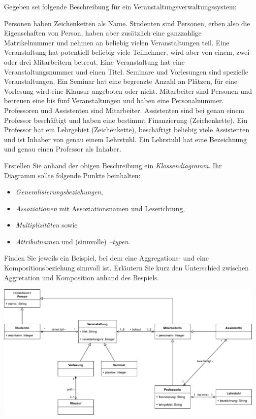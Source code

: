 \documentclass{abgabe}
\begin{document}
\begin{questions}

    Gegeben sei folgende Beschreibung für ein Veranstaltungsverwaltungssystem:

    Personen haben Zeichenketten als Name.
    Studenten sind Personen, erben also die Eigenschaften von Person, haben aber zusätzlich eine ganzzahlige Matrikelnummer und nehmen an beliebig vielen Veranstaltungen teil.
    Eine Veranstaltung hat potentiell beliebig viele Teilnehmer, wird aber von einem, zwei oder drei Mitarbeitern betreut.
    Eine Veranstaltung hat eine Veranstaltungsnummer und einen Titel.
    Seminare und Vorlesungen sind spezielle Veranstaltungen.
    Ein Seminar hat eine begrenzte Anzahl an Plätzen, für eine Vorlesung wird eine Klausur angeboten oder nicht.
    Mitarbeiter sind Personen und betreuen eine bis fünf Veranstaltungen und haben eine Personalnummer.
    Professoren und Assistenten sind Mitarbeiter.
    Assistenten sind bei genau einem Professor beschäftigt und haben eine bestimmt Finanzierung (Zeichenkette).
    Ein Professor hat ein Lehrgebiet (Zeichenkette), beschäftigt beliebig viele Assistenten und ist Inhaber von genau einem Lehrstuhl.
    Ein Lehrstuhl hat eine Bezeichnung und genau einen Professor als Inhaber.

    Erstellen Sie anhand der obigen Beschreibung ein \emph{Klassendiagramm}.
    Ihr Diagramm sollte folgende Punkte beinhalten:
    \begin{itemize}
        \item \emph{Generalisierungsbeziehungen},
        \item \emph{Assoziationen} mit Assoziationsnamen und Leserichtung,
        \item \emph{Multiplizitäten} sowie
        \item \emph{Attributnamen} und (sinnvolle) \emph{–typen}.
    \end{itemize}

    Finden Sie jeweils ein Beispiel, bei dem eine Aggregations- und eine Kompositionsbeziehung sinnvoll ist.
    Erläutern Sie kurz den Unterschied zwischen Aggretation und Komposition anhand des Bespiels.
    \newpage
    \begin{solution}
        \begin{center}
            \includegraphics[width=\textwidth]{swt_h07_veranstaltungsverwaltung.pdf}
        \end{center}


\end{solution}
\end{questions}
\end{document}

